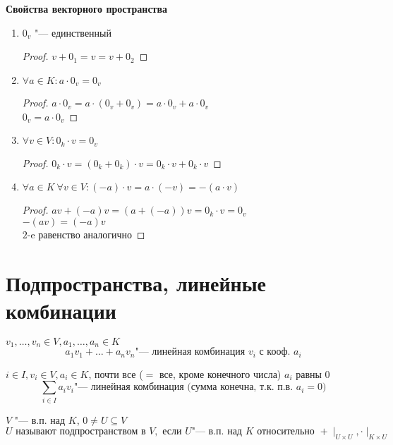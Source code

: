 \textbf{Свойства векторного пространства}

\begin{enumerate}
	\item
		$0_v$ "--- единственный
		\begin{proof}
			$v + 0_1 = v = v + 0_2$
		\end{proof}
	\item
		$\forall a \in K \colon a \cdot 0_v = 0_v$
		\begin{proof}
			$a \cdot 0_v = a \cdot (0_v + 0_v) = a \cdot 0_v + a \cdot 0_v$ \\
			$0_v = a \cdot 0_v$
		\end{proof}
	\item
		$\forall v \in V \colon 0_k \cdot v = 0_v$
		\begin{proof}
			$0_k \cdot v = (0_k + 0_k) \cdot v = 0_k \cdot v + 0_k \cdot v$
		\end{proof}
	\item
		$\forall a \in K ~ \forall v \in V \colon (-a) \cdot v = a \cdot (-v) = -(a \cdot v)$
		\begin{proof}
			$av + (-a)v = (a + (-a))v = 0_k \cdot v = 0_v$ \\
			$-(av) = (-a)v$\\
			$2$-e равенство аналогично
		\end{proof}
\end{enumerate}

\section{Подпространства, линейные комбинации}

\begin{Def}
	$v_1, \dots, v_n \in V, a_1, \dots, a_n \in K$
	\[ a_1v_1 + \dots + a_nv_n \text{"--- линейная комбинация $v_i$ с кооф. $a_i$} \]
\end{Def}

\begin{Def}
	$i \in I, v_i \in V, a_i \in K$, почти все ($=$ все, кроме конечного числа) $a_i$ равны $0$
	\[ \sum_{i \in I} a_iv_i \text{"--- линейная комбинация (сумма конечна, т.к. п.в. $a_i = 0$)} \]
\end{Def}

\begin{Def}
	$V$ "--- в.п. над $K$, $0 \neq U \subseteq V$ \\
	\[U \text{ называют подпространством в } V, \text{ если } U \text{"--- в.п. над } K \text{ относительно } + \mid_{U \times U}, \cdot \mid_{K \times U}\]
\end{Def}


